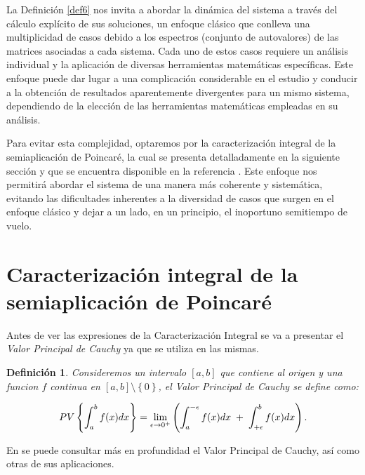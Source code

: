 \documentclass[12pt,a4paper]{report} %
\newtheorem{definicion}{Definición}[chapter]
\begin{document}
	
	\vspace{0.5cm}La Definición \ref{def6} nos invita a abordar la dinámica del sistema a través del cálculo explícito de sus soluciones, un enfoque clásico que conlleva una multiplicidad de casos debido a los espectros (conjunto de autovalores) de las matrices asociadas a cada sistema. Cada uno de estos casos requiere un análisis individual y la aplicación de diversas herramientas matemáticas específicas. Este enfoque puede dar lugar a una complicación considerable en el estudio y conducir a la obtención de resultados aparentemente divergentes para un mismo sistema, dependiendo de la elección de las herramientas matemáticas empleadas en su análisis.
	
	\vspace{0.5cm}\noindent Para evitar esta complejidad, optaremos por la caracterización integral de la semiaplicación de Poincaré, la cual se presenta detalladamente en la siguiente sección y que se encuentra disponible en la referencia \cite{caracterizacion}. Este enfoque nos permitirá abordar el sistema de una manera más coherente y sistemática, evitando las dificultades inherentes a la diversidad de casos que surgen en el enfoque clásico y dejar a un lado, en un principio, el inoportuno semitiempo de vuelo.
	\newpage
	
	\section{Caracterización integral de la semiaplicación de Poincaré}
	
	
	\vspace{0.5cm} Antes de ver las expresiones de la Caracterización Integral se va a presentar el \textit{Valor Principal de Cauchy} ya que se utiliza en las mismas.
	\begin{definicion}
	
	 Consideremos un intervalo $[a,b]$ que contiene al origen y una funcion $f$ continua en $[a,b] \setminus \left\{0\right\}$, el Valor Principal de Cauchy se define como:
	
	\begin{equation}
		\scalebox{1}{$\displaystyle
			PV\left\{\int_{a}^{b}f(x)dx\right\}= \lim_{\epsilon \to 0^+}\left(
			\int_{a}^{-\epsilon}f(x)dx \; + \; 
			\int_{+\epsilon}^{b}f(x)dx
			\right).
			$}
	\end{equation}\smallskip
	
    \end{definicion}
    
	\noindent En \cite{pv} se puede consultar más en profundidad el Valor Principal de Cauchy, así como otras de sus aplicaciones.
	
\end{document}
